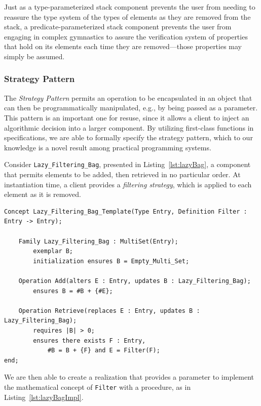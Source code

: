 Just as a type-parameterized stack component prevents the user from needing to reassure the type system of the types of elements as they are removed from the stack, a predicate-parameterized stack component prevents the user from engaging in complex gymnastics to assure the verification system of properties that hold on its elements each time they are removed---those properties may simply be assumed. 

		\subsubsection{Strategy Pattern\label{strategyPattern}}

The \emph{Strategy Pattern} permits an operation to be encapsulated in an object that can then be programmatically manipulated, e.g., by being passed as a parameter.  This pattern is an important one for resuse, since it allows a client to inject an algorithmic decision into a larger component.  By utilizing first-class functions in specifications, we are able to formally specify the strategy pattern, which to our knowledge is a novel result among practical programming systems.

Consider \texttt{Lazy\_Filtering\_Bag}, presented in Listing~\ref{lst:lazyBag}, a component that permits elements to be added, then retrieved in no particular order.   At instantiation time, a client provides a \emph{filtering strategy}, which is applied to each element as it is removed.

\begin{lstlisting}[float=h,language=resolve,caption={A specification for \texttt{Lazy\_Filtering\_Bag}\label{lst:lazyBag}}]
Concept Lazy_Filtering_Bag_Template(Type Entry, Definition Filter : Entry -> Entry);
	
	Family Lazy_Filtering_Bag : MultiSet(Entry);
		exemplar B;
		initialization ensures B = Empty_Multi_Set;

	Operation Add(alters E : Entry, updates B : Lazy_Filtering_Bag);
		ensures B = #B + {#E};

	Operation Retrieve(replaces E : Entry, updates B : Lazy_Filtering_Bag);
		requires |B| > 0;
		ensures there exists F : Entry,
			#B = B + {F} and E = Filter(F);
end;
\end{lstlisting}

We are then able to create a realization that provides a parameter to implement the mathematical concept of \texttt{Filter} with a procedure, as in Listing~\ref{lst:lazyBagImpl}.

